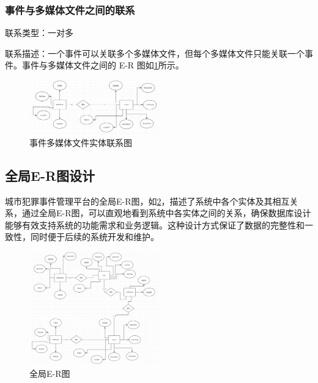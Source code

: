 \subsubsection{事件与多媒体文件之间的联系}

联系类型：一对多

联系描述：一个事件可以关联多个多媒体文件，但每个多媒体文件只能关联一个事件。事件与多媒体文件之间的 E-R 图如\cref{fig:rela-event-mediafile}所示。

\begin{figure}[htbp]
    \centering
    \includegraphics[width=0.5\textwidth]{figures/db-img-rela-03.png}
    \caption{事件多媒体文件实体联系图}
    \label{fig:rela-event-mediafile}
\end{figure}



\subsection{全局E-R图设计}

城市犯罪事件管理平台的全局E-R图，如\cref{fig:rela-tot}，描述了系统中各个实体及其相互关系，通过全局E-R图，可以直观地看到系统中各实体之间的关系，确保数据库设计能够有效支持系统的功能需求和业务逻辑。这种设计方式保证了数据的完整性和一致性，同时便于后续的系统开发和维护。

\begin{figure}[htbp]
    \centering
    \includegraphics[width=0.5\textwidth]{figures/db-img-rela-tot.png}
    \caption{全局E-R图}
    \label{fig:rela-tot}
\end{figure}
